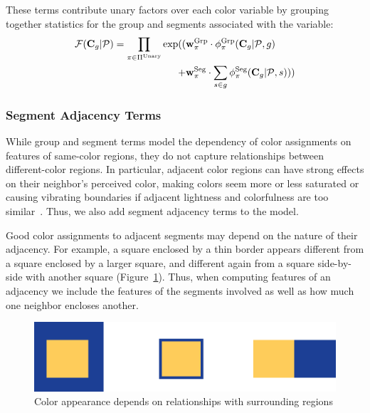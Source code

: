 These terms contribute unary factors over each color variable by grouping together statistics for the group and segments associated with the variable:
\begin{align*}
 \mathcal{F}(\mathbf{C}_g | \mathcal{P}) = \prod_{\pi \in \Pi^{\textrm{Unary}}}
 		\exp( (&\mathbf{w}^{\textrm{Grp}}_\pi \cdot \phi^{\textrm{Grp}}_\pi(\mathbf{C}_g | \mathcal{P}, g)  \\
 		     + &\mathbf{w}^{\textrm{Seg}}_\pi \cdot \sum_{s \in g} \phi^{\textrm{Seg}}_\pi(\mathbf{C}_g | \mathcal{P}, s))) 
\end{align*}


\subsubsection{Segment Adjacency Terms}
\label{sec:adjTerms}

While group and segment terms model the dependency of color assignments on features of same-color regions, they do not capture relationships between different-color regions. In particular, adjacent color regions can have strong effects on their neighbor's perceived color, making colors seem more or less saturated or causing vibrating boundaries if adjacent lightness and colorfulness are too similar~\cite{AlbersInteractionOfColor}. Thus, we also add segment adjacency terms to the model.

Good color assignments to adjacent segments may depend on the nature of their adjacency. For example, a square enclosed by a thin border appears different from a square enclosed by a larger square, and different again from a square side-by-side with another square (Figure~\ref{fig:surround}). Thus, when computing features of an adjacency we include the features of the segments involved as well as how much one neighbor encloses another.
\begin{figure}[ht]
\centering
\includegraphics[width=.7\columnwidth]{figs/surround}
\caption{Color appearance depends on relationships with surrounding regions}
\label{fig:surround}
\end{figure}



